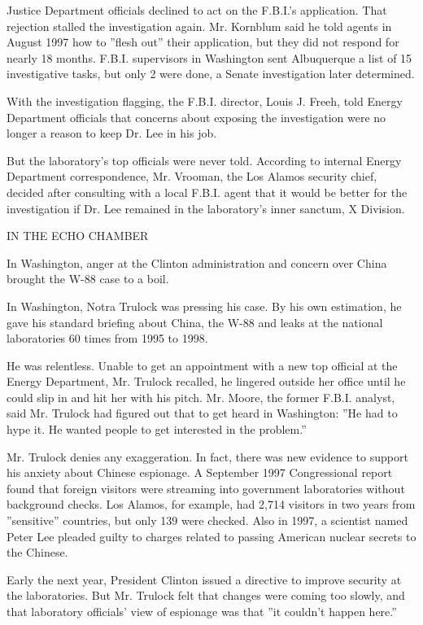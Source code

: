 Justice Department officials declined to act on the F.B.I.'s
application. That rejection stalled the investigation again. Mr.
Kornblum said he told agents in August 1997 how to ''flesh out'' their
application, but they did not respond for nearly 18 months. F.B.I.
supervisors in Washington sent Albuquerque a list of 15 investigative
tasks, but only 2 were done, a Senate investigation later determined.

With the investigation flagging, the F.B.I. director, Louis J. Freeh,
told Energy Department officials that concerns about exposing the
investigation were no longer a reason to keep Dr. Lee in his job.

But the laboratory's top officials were never told. According to
internal Energy Department correspondence, Mr. Vrooman, the Los Alamos
security chief, decided after consulting with a local F.B.I. agent that
it would be better for the investigation if Dr. Lee remained in the
laboratory's inner sanctum, X Division.

IN THE ECHO CHAMBER

In Washington, anger at the Clinton administration and concern over
China brought the W-88 case to a boil.

In Washington, Notra Trulock was pressing his case. By his own
estimation, he gave his standard briefing about China, the W-88 and
leaks at the national laboratories 60 times from 1995 to 1998.

He was relentless. Unable to get an appointment with a new top official
at the Energy Department, Mr. Trulock recalled, he lingered outside her
office until he could slip in and hit her with his pitch. Mr. Moore, the
former F.B.I. analyst, said Mr. Trulock had figured out that to get
heard in Washington: ''He had to hype it. He wanted people to get
interested in the problem.''

Mr. Trulock denies any exaggeration. In fact, there was new evidence to
support his anxiety about Chinese espionage. A September 1997
Congressional report found that foreign visitors were streaming into
government laboratories without background checks. Los Alamos, for
example, had 2,714 visitors in two years from ''sensitive'' countries,
but only 139 were checked. Also in 1997, a scientist named Peter Lee
pleaded guilty to charges related to passing American nuclear secrets to
the Chinese.

Early the next year, President Clinton issued a directive to improve
security at the laboratories. But Mr. Trulock felt that changes were
coming too slowly, and that laboratory officials' view of espionage was
that ''it couldn't happen here.''

